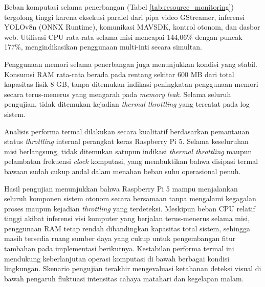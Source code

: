 Beban komputasi selama penerbangan (Tabel \ref{tab:resource_monitoring}) tergolong tinggi karena eksekusi paralel dari pipa video GStreamer, inferensi YOLOv8n (ONNX Runtime), komunikasi MAVSDK, kontrol otonom, dan dasbor web. Utilisasi CPU rata-rata selama misi mencapai 144,06\% dengan puncak 177\%, mengindikasikan penggunaan multi-inti secara simultan.

Penggunaan memori selama penerbangan juga menunjukkan kondisi yang stabil. Konsumsi RAM rata-rata berada pada rentang sekitar 600 MB dari total kapasitas fisik 8 GB, tanpa ditemukan indikasi peningkatan penggunaan memori secara terus-menerus yang mengarah pada \textit{memory leak}. Selama seluruh pengujian, tidak ditemukan kejadian \textit{thermal throttling} yang tercatat pada log sistem.

Analisis performa termal dilakukan secara kualitatif berdasarkan pemantauan status \textit{throttling} internal perangkat keras Raspberry Pi 5. Selama keseluruhan misi berlangsung, tidak ditemukan satupun indikasi \textit{thermal throttling} maupun pelambatan frekuensi \textit{clock} komputasi, yang membuktikan bahwa disipasi termal bawaan sudah cukup andal dalam menahan beban suhu operasional penuh.

\begin{table}[H]
	\centering
	\caption{Hasil Pengujian Performa Termal dan Resource saat Penerbangan}
	\label{tab:resource_monitoring}
	\renewcommand{\arraystretch}{1.2}
	\small
\end{table}

Hasil pengujian menunjukkan bahwa Raspberry Pi 5 mampu menjalankan seluruh komponen sistem otonom secara bersamaan tanpa mengalami kegagalan proses maupun kejadian \textit{throttling} yang terdeteksi. Meskipun beban CPU relatif tinggi akibat inferensi visi komputer yang berjalan terus-menerus selama misi, penggunaan RAM tetap rendah dibandingkan kapasitas total sistem, sehingga masih tersedia ruang sumber daya yang cukup untuk pengembangan fitur tambahan pada implementasi berikutnya. Kestabilan performa termal ini mendukung keberlanjutan operasi komputasi di bawah berbagai kondisi lingkungan. Skenario pengujian terakhir mengevaluasi ketahanan deteksi visual di bawah pengaruh fluktuasi intensitas cahaya matahari dan kegelapan malam.

